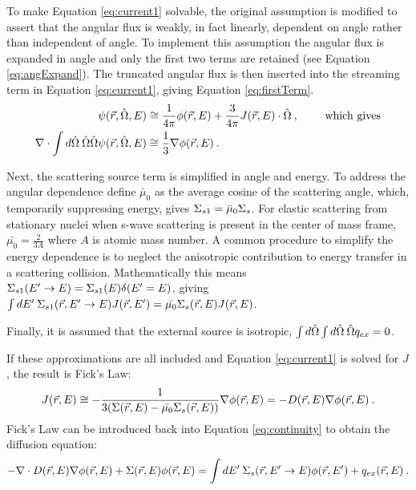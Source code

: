 To make Equation \eqref{eq:current1} solvable, the original assumption is modified to assert that the angular flux is weakly, in fact linearly, dependent on angle rather than independent of angle. To implement this assumption the angular flux is expanded in angle and only the first two terms are retained (see Equation \eqref{eq:angExpand}). The truncated angular flux is then inserted into the streaming term in Equation \eqref{eq:current1}, giving Equation \eqref{eq:firstTerm}.
%
\begin{align}
\psi(\vec{r}, \hat{\Omega}, E) &\cong \frac{1}{4 \pi} \phi(\vec{r}, E) + \frac{3}{4 \pi}J(\vec{r}, E) \cdot \hat{\Omega} \:, \qquad \text{ which gives} \label{eq:angExpand} \\
\nabla \cdot \int d \hat{\Omega} \:\hat{\Omega} \hat{\Omega} \psi(\vec{r}, \hat{\Omega}, E)  &\cong \frac{1}{3} \nabla \phi(\vec{r}, E) \:. \label{eq:firstTerm}
\end{align}

Next, the scattering source term is simplified in angle and energy. To address the angular dependence define $\bar{\mu}_{0}$ as the average cosine of the scattering angle, which, temporarily suppressing energy, gives $\Sigma_{s1} = \bar{\mu}_{0}\Sigma_{s}$. For elastic scattering from stationary nuclei when s-wave scattering is present in the center of mass frame, $\bar{\mu_{0}} = \frac{2}{3A}$ where $A$ is atomic mass number. A common procedure to simplify the energy dependence is to neglect the anisotropic contribution to energy transfer in a scattering collision. Mathematically this means $\Sigma_{s1}(E' \to E) = \Sigma_{s1}(E) \delta(E' = E)$, giving $\int dE' \:\Sigma_{s1}(\vec{r}, E' \to E)J(\vec{r},E') = \bar{\mu_{0}}\Sigma_{s}(\vec{r},E)J(\vec{r},E)$. 

Finally, it is assumed that the external source is isotropic, $\int  d\hat{\Omega} \int d\hat{\Omega} \:\hat{\Omega} q_{ex} = 0$.

If these approximations are all included and Equation \eqref{eq:current1} is solved for $J$, the result is Fick's Law:
%
\begin{equation}
  J(\vec{r},E) \cong -\frac{1}{3(\Sigma(\vec{r},E) - \bar{\mu_{0}}\Sigma_{s}(\vec{r},E))} \nabla \phi (\vec{r},E) = -D(\vec{r},E) \nabla \phi (\vec{r},E) \:.
\end{equation}
%
Fick's Law can be introduced back into Equation \eqref{eq:continuity} to obtain the diffusion equation:
%
\begin{equation}
  -\nabla \cdot D(\vec{r},E) \nabla \phi(\vec{r},E) + \Sigma(\vec{r},E)\phi(\vec{r},E) = \int dE' \:\Sigma_{s}(\vec{r}, E' \to E)\phi(\vec{r},E') + q_{ex}(\vec{r},E) \:.
  \label{eq:diffusion}
\end{equation}

